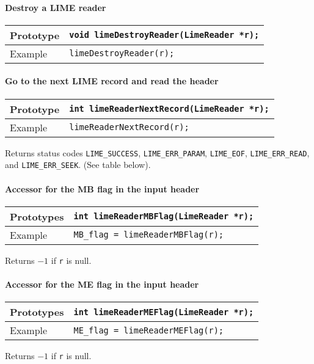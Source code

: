 \documentclass{article}
\begin{document}
\paragraph{Destroy a LIME reader}
%
\begin{flushleft}
  \begin{tabular}{|l|l|}
  \hline
  Prototype      & \verb|void limeDestroyReader(LimeReader *r);| \\
\hline
  Example  & \verb|limeDestroyReader(r);| \\
   \hline
 \end{tabular}
\end{flushleft}
%

\paragraph{Go to the next LIME record and read the header}
%
\begin{flushleft}
  \begin{tabular}{|l|l|}
  \hline
  Prototype      & \verb|int limeReaderNextRecord(LimeReader *r);| \\
\hline
  Example  & \verb|limeReaderNextRecord(r);| \\
   \hline
 \end{tabular}
\end{flushleft}
%
Returns status codes {\tt LIME\_SUCCESS}, {\tt LIME\_ERR\_PARAM}, {\tt LIME\_EOF},
{\tt LIME\_ERR\_READ}, and {\tt LIME\_ERR\_SEEK}.  (See table below).

\paragraph{Accessor for the MB flag in the input header}
%
\begin{flushleft}
  \begin{tabular}{|l|l|}
  \hline
  Prototypes     & \verb|int limeReaderMBFlag(LimeReader *r);| \\
\hline
  Example  & \verb|MB_flag = limeReaderMBFlag(r);| \\
   \hline
 \end{tabular}
\end{flushleft}
%
Returns $-1$ if {\tt r} is null.

\paragraph{Accessor for the ME flag in the input header}
%
\begin{flushleft}
  \begin{tabular}{|l|l|}
  \hline
  Prototypes     & \verb|int limeReaderMEFlag(LimeReader *r);| \\
\hline
  Example  & \verb|ME_flag = limeReaderMEFlag(r);| \\
   \hline
 \end{tabular}
\end{flushleft}
%
Returns $-1$ if {\tt r} is null.
\end{document}
